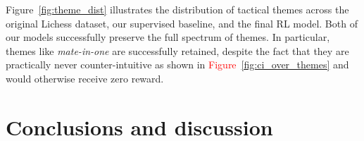 \documentclass[letterpaper]{article} %
\begin{document}
Figure~\ref{fig:theme_dist} illustrates the distribution of tactical themes across the original Lichess dataset, our supervised baseline, and the final RL model. Both of our models successfully preserve the full spectrum of themes. In particular, themes like \textit{mate-in-one} are successfully retained, despite the fact that they are practically never counter-intuitive as shown in \textcolor{red}{Figure~\ref{fig:ci_over_themes}} and would otherwise receive zero reward.










\section{Conclusions and discussion}





\end{document}
